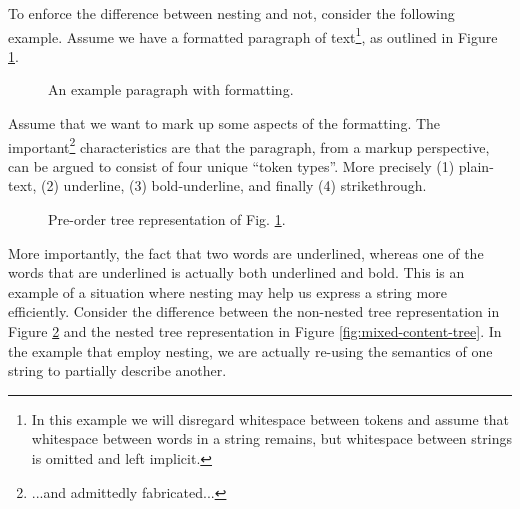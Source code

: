 \documentclass{scrreprt}
\begin{document}
To enforce the difference between nesting and not, consider the following example. Assume we have a formatted paragraph of text\footnote{In this example we will disregard whitespace between tokens and assume that whitespace between words in a string remains, but whitespace between strings is omitted and left implicit.}, as outlined in Figure \ref{fig:mixed-content-paragraph}.


\begin{figure}[h]
\centering
{}
\caption{An example paragraph with formatting.}
\label{fig:mixed-content-paragraph}
\end{figure}


Assume that we want to mark up some aspects of the formatting. The important\footnote{...and admittedly fabricated...} characteristics are that the paragraph, from a markup perspective, can be argued to consist of four unique ``token types''. More precisely (1) plain-text, (2) underline, (3) bold-underline, and finally (4) strikethrough.





\begin{figure}[h]
  \centering

  \caption{Pre-order tree representation of Fig. \ref{fig:mixed-content-paragraph}.}
  \label{fig:mixed-content-flat-tree}
\end{figure}



More importantly, the fact that two words are underlined, whereas one of the words that are underlined is actually both underlined and bold. This is an example of a situation where nesting may help us express a string more efficiently. Consider the difference between the non-nested tree representation in Figure \ref{fig:mixed-content-flat-tree} and the nested tree representation in Figure \ref{fig:mixed-content-tree}. In the example that employ nesting, we are actually re-using the semantics of one string to partially describe another.
\end{document}

